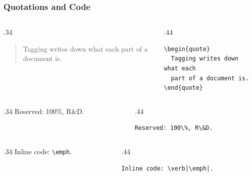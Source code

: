 \documentclass{ltx-talk}
\begin{document}
\begin{frame*}
  \frametitle{Quotations and Code}
  \begin{columns}
    \begin{column}{.34\textwidth}
      \begin{quote}
        Tagging writes down what each part of a document is.
      \end{quote}
    \end{column}
    \begin{column}{.44\textwidth}
\small
\begin{verbatim}
\begin{quote}
  Tagging writes down what each
  part of a document is.
\end{quote}
\end{verbatim}
    \end{column}
  \end{columns}

  \begin{columns}
    \begin{column}{.34\textwidth}
      Reserved: 100\%, R\&D.
    \end{column}
    \begin{column}{.44\textwidth}
\small
\begin{verbatim}
Reserved: 100\%, R\&D.
\end{verbatim}
    \end{column}
  \end{columns}

  \begin{columns}
    \begin{column}{.34\textwidth}
      Inline code: \verb|\emph|.
    \end{column}
    \begin{column}{.44\textwidth}
\small
\begin{verbatim}
Inline code: \verb|\emph|.
\end{verbatim}
    \end{column}
  \end{columns}
\end{frame*}
\end{document}
